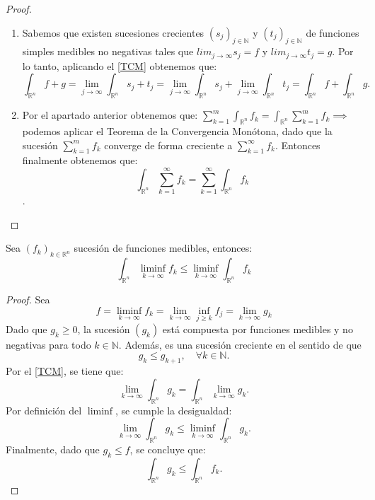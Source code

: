\begin{proof}
    \leavevmode
    \begin{enumerate}
        \item Sabemos que existen sucesiones crecientes \( (s_j)_{j \in \mathbb{N}} \) y \(
              (t_j)_{j \in \mathbb{N}} \) de funciones simples medibles no negativas tales
              que $lim_{j \to \infty} s_j = f$ y $lim_{j \to \infty} t_j = g$. Por lo tanto,
              aplicando el \cref{TCM} obtenemos que: $$
                  \int_{\mathbb{R}^n}f+g = \lim_{j\to \infty}\int_{\mathbb{R}^n}s_j + t_j =
                  \lim_{j\to \infty}\int_{\mathbb{R}^n}s_j + \lim_{j\to
                      \infty}\int_{\mathbb{R}^n}t_j = \int_{\mathbb{R}^n}f + \int_{\mathbb{R}^n}g. $$
        \item  Por el apartado anterior obtenemos que: $\sum_{k = 1}^{m}\int_{\mathbb{R}^n}f_k
                  = \int_{\mathbb{R}^n}\sum_{k = 1}^{m}f_k \implies$ podemos aplicar el Teorema
              de la Convergencia Monótona, dado que la sucesión $\sum_{k = 1}^{m}f_k $
              converge de forma creciente a $\sum_{k = 1}^{\infty}f_k$. Entonces finalmente
              obtenemos que: $$\int_{\mathbb{R}^n}\sum_{k = 1}^{\infty}f_k = \sum_{k =
                      1}^{\infty}\int_{\mathbb{R}^n}f_k$$.
    \end{enumerate}
\end{proof}
\begin{lema}
    Sea $(f_k)_{k\in\mathbb{R}^n}$ sucesión de funciones medibles, entonces: $$\int_{\mathbb{R}^n}\liminf_{k\to\infty}f_k \leq \liminf_{k\to\infty}\int_{\mathbb{R}^n}f_k$$
\end{lema}
\begin{proof}
    Sea $$ f = \liminf_{k \to \infty} f_k = \lim_{k \to \infty} \inf_{j \geq k} f_j = \lim_{k \to \infty} g_k $$
    Dado que $ g_k \geq 0 $, la sucesión $ (g_k) $ está compuesta por funciones medibles y no negativas para todo $ k \in \mathbb{N} $. Además, es una sucesión creciente en el sentido de que
    $$ g_k \leq g_{k+1}, \quad \forall k \in \mathbb{N}. $$ Por el \cref{TCM}, se tiene que:
    $$ \lim_{k \to \infty} \int_{\mathbb{R}^n} g_k = \int_{\mathbb{R}^n} \lim_{k \to \infty} g_k.$$ Por definición del $ \liminf $, se cumple la desigualdad:
    $$\lim_{k \to \infty} \int_{\mathbb{R}^n} g_k \leq \liminf_{k \to \infty} \int_{\mathbb{R}^n} g_k.$$
    Finalmente, dado que $ g_k \leq f $, se concluye que:
    $$\int_{\mathbb{R}^n} g_k \leq \int_{\mathbb{R}^n} f_k.$$
\end{proof}
